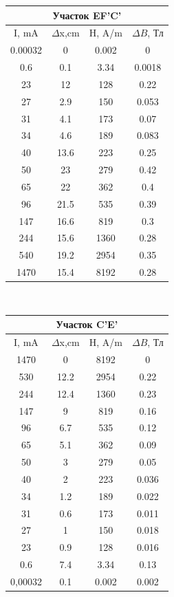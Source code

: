 \documentclass[a4paper,12pt]{article} %
\begin{document}
\begin{tabular}{|c|c|c|c|}
\hline 
\multicolumn{4}{|c|}{Участок EF'C'} \\ 
\hline
I, mA & $\Delta$x,cm & H, A/m & $\Delta B$, Тл \\
\hline 
0.00032 & 0 & 0.002 &0 \\ 
\hline 
0.6 & 0.1& 3.34 &0.0018 \\ 
\hline 
23 & 12& 128 &0.22 \\ 
\hline 
27 & 2.9 & 150 &0.053 \\ 
\hline 
31 &  4.1& 173 & 0.07\\ 
\hline 
34 & 4.6& 189 & 0.083 \\ 
\hline 
40 & 13.6& 223 & 0.25 \\ 
\hline 
50 & 23& 279 & 0.42\\ 
\hline 
65 & 22& 362& 0.4 \\ 
\hline 
96 & 21.5& 535 & 0.39 \\ 
\hline 
147 & 16.6 & 819 & 0.3\\ 
\hline 
244 & 15.6& 1360 & 0.28 \\ 
\hline 
540 & 19.2& 2954 & 0.35 \\ 
\hline 
1470 & 15.4 & 8192 & 0.28\\ 
\hline 

\end{tabular} 
\\
\begin{tabular}{|c|c|c|c|}
\hline 
\multicolumn{4}{|c|}{Участок C'E'} \\ 
\hline
I, mA & $\Delta$x,cm & H, A/m & $\Delta B$, Тл \\
\hline 
1470 & 0 &  8192     &  0  \\ 
\hline 
530 & 12.2 &    2954   &0.22 \\ 
\hline 
244 & 12.4 &     1360  & 0.23 \\ 
\hline 
147 & 9&    819   & 0.16 \\ 
\hline 
96 & 6.7&    535   & 0.12 \\ 
\hline 
65 & 5.1&     362  &  0.09\\ 
\hline 
50 & 3 &279       & 0.05\\ 
\hline 
40 & 2 &   223    & 0.036 \\ 
\hline 
34 & 1.2&  189     & 0.022 \\ 
\hline 
31 & 0.6 &    173   & 0.011 \\ 
\hline 
27 & 1&    150   &0.018  \\ 
\hline 
23 & 0.9&  128      & 0.016 \\ 
\hline 
0.6 & 7.4&    3.34   & 0.13 \\ 
\hline 
0,00032 & 0.1&    0.002   & 0.002 \\ 
\hline 
\end{tabular} 
\end{document}
